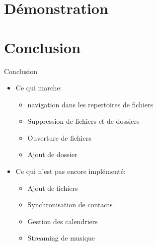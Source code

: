 \documentclass{beamer}
\begin{document}
\section{Démonstration}

\section{Conclusion}
	\begin{frame}{Conclusion}
	\begin{itemize}
	\item Ce qui marche:
		\begin{itemize}
		\item navigation dans les repertoires de fichiers
		\item Suppression de fichiers et de dossiers
		\item Ouverture de fichiers
		\item Ajout de dossier 
		\end{itemize}
	\pause
	\item Ce qui n'est pas encore implémenté:
		\begin{itemize}
		\item Ajout de fichiers
		\item Synchronisation de contacts
		\item Gestion des calendriers
		\item Streaming de musique
		\end{itemize}
	\end{itemize}
	\end{frame}
\end{document}
